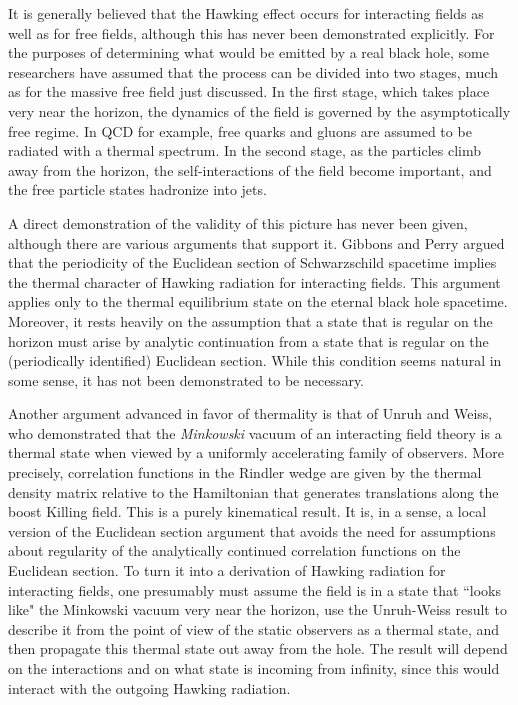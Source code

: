 \documentclass[12pt]{article}
\begin{document}
It is generally believed that the Hawking effect occurs for
interacting fields as well as for free fields, although this
has never been demonstrated explicitly. For the purposes of
determining what would be emitted by a real black hole, some
researchers \cite{Halzen} have assumed that the process  can
be divided into two stages, much as for the massive free
field just discussed. In the first stage, which takes place
very near the horizon, the dynamics of the field is governed
by the asymptotically free regime. In QCD for
example, free quarks and gluons are assumed to be radiated
with a thermal spectrum. In the second stage, as the
particles climb away from the horizon, the self-interactions
of the field become important, and the free particle states
hadronize into jets.

A direct demonstration of the validity
of this picture has never been given, although there are
various arguments that support it. Gibbons and
Perry\cite{GibbPerry} argued that the periodicity of the
Euclidean section of Schwarzschild
spacetime implies the thermal character of Hawking radiation for
interacting fields. This argument
applies only to the thermal equilibrium state on the eternal
black hole spacetime. Moreover, it rests heavily on the
assumption that a state that is regular on the horizon must
arise by analytic continuation from a state that is regular
on the (periodically identified) Euclidean section. While
this condition seems natural in some sense, it has not been
demonstrated to be necessary.

Another argument advanced in favor of thermality is that of Unruh
and Weiss\cite{UnruhWeiss}, who demonstrated that the {\it Minkowski}
vacuum of an interacting field theory is a thermal state when
viewed by a uniformly accelerating family of observers. More
precisely, correlation functions in the Rindler wedge are given
by the thermal density matrix relative to the Hamiltonian that
generates translations along the boost Killing field.
This is a purely kinematical result. It is, in a sense, a
local version of the Euclidean section argument that avoids
the need for assumptions about regularity of the
analytically continued correlation functions on the
Euclidean section. To turn it into a derivation of Hawking
radiation for interacting fields, one presumably must assume
the field is in a state that ``looks like" the Minkowski vacuum
very near the horizon, use the Unruh-Weiss result to describe
it from the point of view of the static observers as a thermal
state, and then propagate this thermal state out away from
the hole. The result will depend on the interactions and on
what state is incoming from infinity, since this would interact
with the outgoing Hawking radiation.
\end{document}
